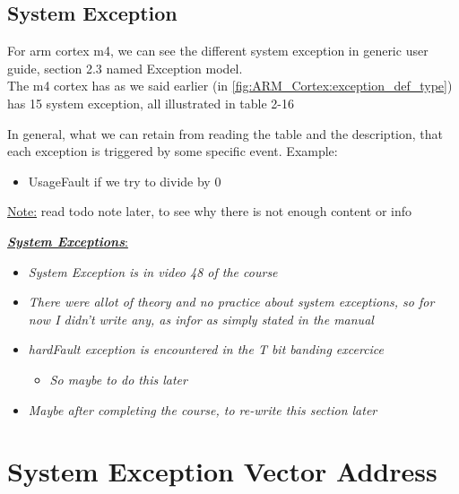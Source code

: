 \subsection{System Exception}

For arm cortex m4, we can see the different system exception in generic user guide, section 2.3 named Exception model.\\

The m4 cortex has as we said earlier (in \autoref{fig:ARM_Cortex:exception_def_type}) has 15 system exception, all illustrated in table 2-16

In general, what we can retain from reading the table and the description, that each exception is triggered by some specific event. Example:

\begin{itemize}

\item UsageFault if we try to divide by 0

\end{itemize}

\underline{Note:} read todo note later, to see why there is not enough content or info

\newpage
\underline{\textit{\textbf{System Exceptions}}:}

\begin{itemize}

\item \textit{System Exception is in video 48 of the course}

\item \textit{There were allot of theory and no practice about system exceptions, so for now I didn't write any, as infor as simply stated in the manual}

\item \textit{hardFault exception is encountered in the T bit banding excercice}

	\begin{itemize}
	\item \textit{So maybe to do this later}
	\end{itemize}

\item \textit{Maybe after completing the course, to re-write this section later}

\end{itemize}


\newpage
\section{System Exception Vector Address}

